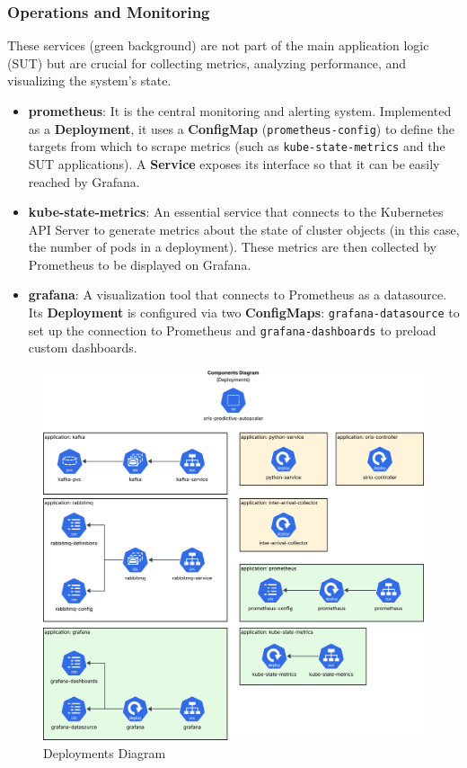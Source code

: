 \subsubsection{Operations and Monitoring}
These services (green background) are not part of the main application logic (SUT) but are crucial for collecting metrics, analyzing performance, and visualizing the system's state.

\begin{itemize}
    \item \textbf{prometheus}: It is the central monitoring and alerting system. Implemented as a \textbf{Deployment}, it uses a \textbf{ConfigMap} (\verb|prometheus-config|) to define the targets from which to scrape metrics (such as \verb|kube-state-metrics| and the SUT applications). A \textbf{Service} exposes its interface so that it can be easily reached by Grafana.
    \item \textbf{kube-state-metrics}: An essential service that connects to the Kubernetes API Server to generate metrics about the state of cluster objects (in this case, the number of pods in a deployment). These metrics are then collected by Prometheus to be displayed on Grafana.
    \item \textbf{grafana}: A visualization tool that connects to Prometheus as a datasource. Its \textbf{Deployment} is configured via two \textbf{ConfigMaps}: \verb|grafana-datasource| to set up the connection to Prometheus and \verb|grafana-dashboards| to preload custom dashboards. 
\end{itemize}

 \begin{figure}[ht]
    \centering
    \includegraphics[width=0.75\linewidth]{images/C4 model/componentDiagram_deploy.png}
    \caption{Deployments Diagram}
    \label{fig:component_diagram_deploy}
\end{figure}

